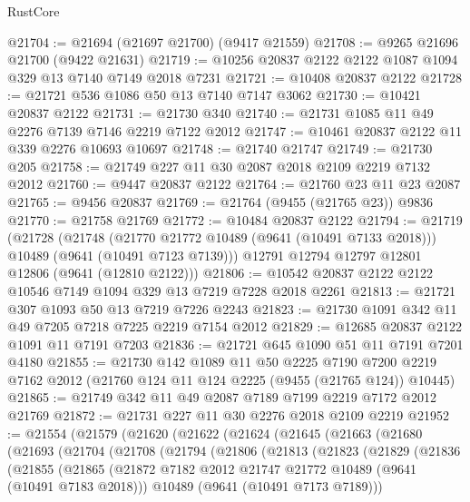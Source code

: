 \begin{lexlean}{RustCore}
\begin{coremodule}
@21704 := @21694 (@21697 @21700) (@9417 @21559)
@21708 := @9265 @21696 @21700 (@9422 @21631)
@21719 := @10256 @20837 @2122 @2122 @1087 @1094 @329 @13 @7140 @7149 @2018 @7231
@21721 := @10408 @20837 @2122
@21728 := @21721 @536 @1086 @50 @13 @7140 @7147 @3062
@21730 := @10421 @20837 @2122
@21731 := @21730 @340
@21740 := @21731 @1085 @11 @49 @2276 @7139 @7146 @2219 @7122 @2012
@21747 := @10461 @20837 @2122 @11 @339 @2276 @10693 @10697
@21748 := @21740 @21747
@21749 := @21730 @205
@21758 := @21749 @227 @11 @30 @2087 @2018 @2109 @2219 @7132 @2012
@21760 := @9447 @20837 @2122
@21764 := @21760 @23 @11 @23 @2087
@21765 := @9456 @20837
@21769 := @21764 (@9455 (@21765 @23)) @9836
@21770 := @21758 @21769
@21772 := @10484 @20837 @2122
@21794 := @21719
    (@21728
      (@21748
        (@21770 @21772 @10489 (@9641 (@10491 @7133 @2018)))
        @10489
        (@9641 (@10491 @7123 @7139)))
      @12791
      @12794
      @12797
      @12801
      @12806
      (@9641 (@12810 @2122)))
@21806 := @10542 @20837 @2122 @2122 @10546 @7149 @1094 @329 @13 @7219 @7228 @2018 @2261
@21813 := @21721 @307 @1093 @50 @13 @7219 @7226 @2243
@21823 := @21730 @1091 @342 @11 @49 @7205 @7218 @7225 @2219 @7154 @2012
@21829 := @12685 @20837 @2122 @1091 @11 @7191 @7203
@21836 := @21721 @645 @1090 @51 @11 @7191 @7201 @4180
@21855 := @21730
    @142
    @1089
    @11
    @50
    @2225
    @7190
    @7200
    @2219
    @7162
    @2012
    (@21760 @124 @11 @124 @2225 (@9455 (@21765 @124)) @10445)
@21865 := @21749 @342 @11 @49 @2087 @7189 @7199 @2219 @7172 @2012 @21769
@21872 := @21731 @227 @11 @30 @2276 @2018 @2109 @2219
@21952 := @21554
    (@21579
      (@21620
        (@21622
          (@21624
            (@21645
              (@21663
                (@21680
                  (@21693
                    (@21704
                      (@21708
                        (@21794
                          (@21806
                            (@21813
                              (@21823
                                (@21829
                                  (@21836
                                    (@21855
                                      (@21865
                                        (@21872
                                          @7182
                                          @2012
                                          @21747
                                          @21772
                                          @10489
                                          (@9641 (@10491 @7183 @2018)))
                                        @10489
                                        (@9641 (@10491 @7173 @7189)))

\end{coremodule}
\end{lexlean}
